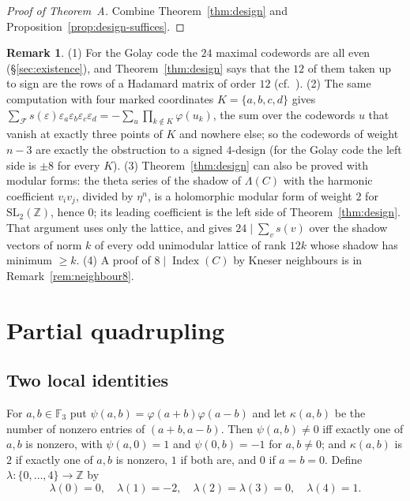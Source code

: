 \documentclass[11pt]{amsart}
\theoremstyle{definition}
\newtheorem{remark}[theorem]{Remark}
\newcommand{\F}{\mathbb{F}_3}
\newcommand{\Z}{\mathbb{Z}}
\newcommand{\Index}{\operatorname{Index}}
\newcommand{\cF}{\mathcal{F}}
\begin{document}
\begin{proof}[Proof of Theorem~A]
Combine Theorem~\ref{thm:design} and Proposition~\ref{prop:design-suffices}.
\end{proof}

\begin{remark}\label{rem:design}
(1) For the Golay code the $24$ maximal codewords are all even (\S\ref{sec:existence}), and
Theorem~\ref{thm:design} says that the $12$ of them taken up to sign are the rows of a Hadamard
matrix of order $12$ (cf.\ \cite{AHM}). (2) The same computation with four marked coordinates
$K=\{a,b,c,d\}$ gives $\sum_\cF s(\varepsilon)\varepsilon_a\varepsilon_b\varepsilon_c\varepsilon_d
=-\sum_u\prod_{k\notin K}\varphi(u_k)$, the sum over the codewords $u$ that vanish at exactly three
points of $K$ and nowhere else; so the codewords of weight $n-3$ are exactly the obstruction to a
signed $4$-design (for the Golay code the left side is $\pm8$ for every $K$). (3)
Theorem~\ref{thm:design} can also be proved with modular forms: the theta series of the shadow of
$\Lambda(C)$ with the harmonic coefficient $v_iv_j$, divided by $\eta^n$, is a holomorphic modular
form of weight $2$ for $\mathrm{SL}_2(\Z)$, hence $0$; its leading coefficient is the left side of
Theorem~\ref{thm:design}. That argument uses only the lattice, and gives
$24\mid\sum_vs(v)$ over the shadow vectors of norm $k$ of every odd unimodular lattice of rank $12k$
whose shadow has minimum $\ge k$. (4) A proof of $8\mid\Index(C)$ by Kneser neighbours is in
Remark~\ref{rem:neighbour8}.
\end{remark}

\section{Partial quadrupling}\label{sec:Q}

\subsection{Two local identities}
For $a,b\in\F$ put $\psi(a,b)=\varphi(a+b)\varphi(a-b)$ and let $\kappa(a,b)$ be the number of
nonzero entries of $(a+b,a-b)$. Then $\psi(a,b)\ne0$ iff exactly one of $a,b$ is nonzero, with
$\psi(a,0)=1$ and $\psi(0,b)=-1$ for $a,b\ne0$; and $\kappa(a,b)$ is $2$ if exactly one of $a,b$ is
nonzero, $1$ if both are, and $0$ if $a=b=0$. Define $\lambda\colon\{0,\dots,4\}\to\Z$ by
\[
  \lambda(0)=0,\quad\lambda(1)=-2,\quad\lambda(2)=\lambda(3)=0,\quad\lambda(4)=1.
\]
\end{document}
